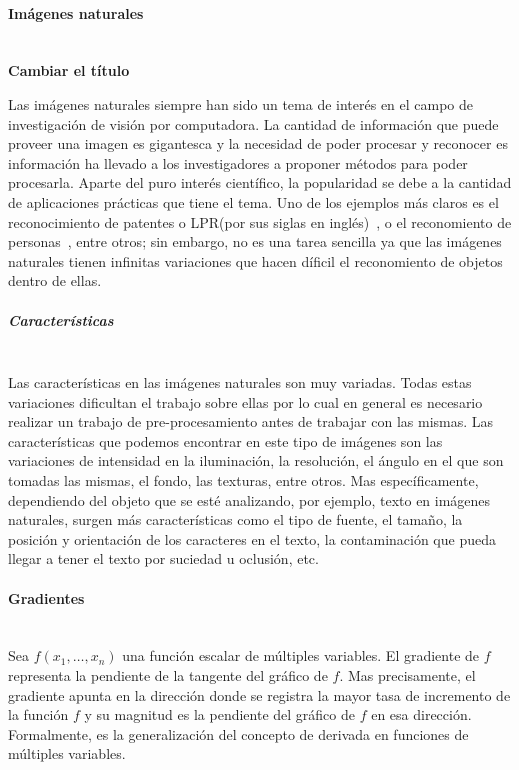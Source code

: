 \paragraph{Imágenes naturales} ~\\

	\textbf{Cambiar el título}
	
	Las imágenes naturales siempre han sido un tema de interés en el campo de investigación de visión por computadora. La cantidad de información que puede proveer una imagen es gigantesca y la necesidad de poder procesar y reconocer es información ha llevado a los investigadores a proponer métodos para poder procesarla.	Aparte del puro interés científico, la popularidad se debe a la cantidad de aplicaciones prácticas que tiene el tema. Uno de los ejemplos más claros es el reconocimiento de patentes o LPR(por sus siglas en inglés)~\cite{DAB}, o el reconomiento de personas~\cite{DT05}, entre otros; sin embargo, no es una tarea sencilla ya que las imágenes naturales tienen infinitas variaciones que hacen díficil el reconomiento de objetos dentro de ellas.
	
	
	\subparagraph{Características} ~\\
	
		Las características en las imágenes naturales son muy variadas. Todas estas variaciones dificultan el trabajo sobre ellas por lo cual en general es necesario realizar un trabajo de pre-procesamiento antes de trabajar con las mismas. Las características que podemos encontrar en este tipo de imágenes son las variaciones de intensidad en la iluminación, la resolución, el ángulo en el que son tomadas las mismas, el fondo, las texturas, entre otros. Mas específicamente, dependiendo del objeto que se esté analizando, por ejemplo, texto en imágenes naturales, surgen más características como el tipo de fuente, el tamaño, la posición y orientación de los caracteres en el texto, la contaminación que pueda llegar a tener el texto por suciedad u oclusión, etc.
	
\paragraph{Gradientes} ~\\

	Sea $f(x_1,\dots,x_n)$ una función escalar de múltiples variables. El gradiente de $f$ representa la pendiente de la tangente del gráfico de $f$.  Mas precisamente, el gradiente apunta en la dirección donde se registra la mayor tasa de incremento de la función $f$ y su magnitud es la pendiente del gráfico de $f$ en esa dirección. Formalmente, es la generalización del concepto de derivada en funciones de múltiples variables.
		
